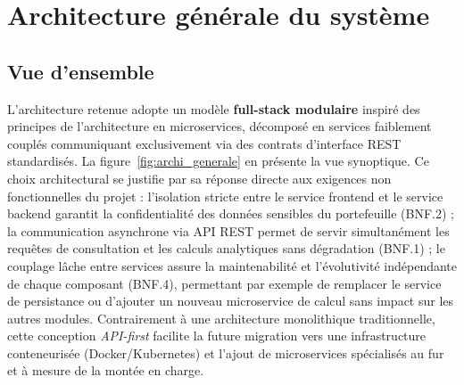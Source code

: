 \documentclass[12pt,a4paper]{report}
\begin{document}
\section{Architecture générale du système}

\subsection{Vue d'ensemble}

L'architecture retenue adopte un modèle \textbf{full-stack modulaire} inspiré des principes de l'architecture en microservices, décomposé en services faiblement couplés communiquant exclusivement via des contrats d'interface REST standardisés. La figure~\ref{fig:archi_generale} en présente la vue synoptique. Ce choix architectural se justifie par sa réponse directe aux exigences non fonctionnelles du projet : l'isolation stricte entre le service frontend et le service backend garantit la confidentialité des données sensibles du portefeuille (BNF.2) ; la communication asynchrone via API REST permet de servir simultanément les requêtes de consultation et les calculs analytiques sans dégradation (BNF.1) ; le couplage lâche entre services assure la maintenabilité et l'évolutivité indépendante de chaque composant (BNF.4), permettant par exemple de remplacer le service de persistance ou d'ajouter un nouveau microservice de calcul sans impact sur les autres modules. Contrairement à une architecture monolithique traditionnelle, cette conception \textit{API-first} facilite la future migration vers une infrastructure conteneurisée (Docker/Kubernetes) et l'ajout de microservices spécialisés au fur et à mesure de la montée en charge.
\end{document}
